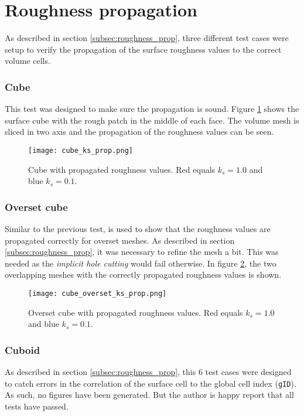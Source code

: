 \section{Roughness propagation}
As described in section \ref{subsec:roughness_prop}, three different test cases
were setup to verify the propagation of the surface roughness values to the
correct volume cells.

\subsubsection{Cube}
This test was designed to make sure the propagation is sound. Figure
\ref{fig:cube_ks_prop} shows the surface cube with the rough patch in the middle
of each face. The volume mesh is sliced in two axis and the propagation of the
roughness values can be seen.

\begin{figure}[H] \centering
\texttt{[image: cube\_ks\_prop.png]}
    \caption{Cube with propagated roughness values. Red equals
$k_{s} = 1.0$ and blue $k_{s} = 0.1$.}
    \label{fig:cube_ks_prop}
\end{figure}

\subsubsection{Overset cube}
Similar to the previous test, is used to show that the roughness values are
propagated correctly for  overset meshes. As described in section
\ref{subsec:roughness_prop}, it was necessary to refine the mesh a bit. This was
needed as the \textit{implicit hole cutting} would fail otherwise. In figure
\ref{fig:cube_overset_ks_prop}, the two overlapping meshes with the correctly
propagated roughness values is shown.

\begin{figure}[H] \centering
\texttt{[image: cube\_overset\_ks\_prop.png]}
    \caption{Overset cube with propagated roughness values. Red equals
$k_{s} = 1.0$ and blue $k_{s} = 0.1$.}
    \label{fig:cube_overset_ks_prop}
\end{figure}

\subsubsection{Cuboid}
As described in section \ref{subsec:roughness_prop}, this 6 test cases were
designed to catch errors in the correlation of the surface cell to the global
cell index (\texttt{gID}). As such, no figures have been generated. But the
author is happy report that all tests have passed.

